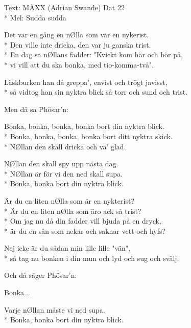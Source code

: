 \begin{SongText}
    \begin{SongInfo}
        Text: MÄXX (Adrian Swande) Dat 22\\*%
        Mel: Sudda sudda 
    \end{SongInfo}
    \begin{SongVerse}
        Det var en gång en nØlla som var en nykerist.\\*%
        Den ville inte dricka, den var ju ganska trist.\\*%
        En dag sa nØllans fadder: "Kvickt kom här och hör på,\\*%
        vi vill att du ska bonka, med tio-komma-två".
    \end{SongVerse}
    \begin{SongVerse}
        Läskburken han då greppa', envist och trögt javisst,\\*%
        så vidtog han sin nyktra blick så torr och sund och trist.
    \end{SongVerse}
    \begin{SongVerse}
        Men då sa Phösar'n:
    \end{SongVerse}
    \begin{SongVerse}
        Bonka, bonka, bonka, bonka bort din nyktra blick.\\*%
        Bonka, bonka, bonka, bonka bort ditt nyktra skick.\\*%
        NØllan den skall dricka och va' glad.
    \end{SongVerse}
    \begin{SongVerse}
        NØllan den skall spy upp nästa dag.\\*%
        NØllan är för vi den ned skall supa.\\*%
        Bonka, bonka bort din nyktra blick.
    \end{SongVerse}
    \begin{SongVerse}
        Är du en liten nØlla som är en nykterist?\\*%
        Är du en liten nØlla som äro ack så trist?\\*%
        Om jag nu då din fadder vill bjuda på en dryck,\\*%
        är du en sån som nekar och saknar vett och hyfs?
    \end{SongVerse}
    \begin{SongVerse}
        Nej icke är du sådan min lille lille "vän",\\*%
        så tag nu bonken i din mun och lyd och sug och svälj.
    \end{SongVerse}
    \begin{SongVerse}
        Och då säger Phösar'n:
    \end{SongVerse}
    \begin{SongVerse}
        Bonka...
    \end{SongVerse}
    \begin{SongVerse}
        Varje nØllan måste vi ned supa.\\*%
    Bonka, bonka bort din nyktra blick.
    \end{SongVerse}
\end{SongText}
